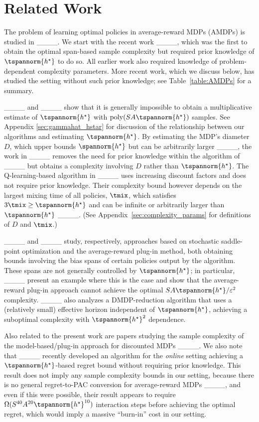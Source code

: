 \section{Related Work}
The problem of learning optimal policies in average-reward MDPs (AMDPs) is studied in ____. We start with the recent work ____, which was the first to obtain the optimal span-based sample complexity but required prior knowledge of $\tspannorm{h^\star}$ to do so. All earlier work also required knowledge of problem-dependent complexity parameters. More recent work, which we discuss below, has studied the setting without such prior knowledge; see Table~\ref{table:AMDPs} for a summary.

____ and ____ show that it is generally impossible to obtain a multiplicative estimate of $\tspannorm{h^\star}$ with $\text{poly}(SA\tspannorm{h^\star})$ samples. See Appendix \ref{sec:gammahat_hstar} for discussion of the relationship between our algorithms and estimating $\tspannorm{h^\star}$. 
By estimating the MDP's diameter $D$, which upper bounds $\spannorm{h^\star} $ but can be arbitrarily larger ____, the work in ____ removes the need for prior knowledge within the algorithm of ____ but obtains a complexity involving $D$ rather than $\tspannorm{h^\star}$. The Q-learning-based algorithm in ____ uses increasing discount factors and does not require prior knowledge. Their complexity bound however depends on the largest mixing time of all policies, $\tmix$, which  satisfies $3\tmix \geq \tspannorm{h^\star}$ and can be infinite or arbitrarily larger than $\tspannorm{h^\star}$ ____.
(See Appendix~\ref{sec:complexity_params} for definitions of $D$ and $\tmix$.) 

____ and ____ study, respectively, approaches based on stochastic saddle-point optimization and the average-reward plug-in method, both obtaining bounds involving the bias spans of certain policies output by the algorithm. These spans are not generally controlled by $\tspannorm{h^\star}$; in particular, ____ present an example where this is the case and show that the average-reward plug-in approach cannot achieve the optimal $SA \tspannorm{h^\star}/\varepsilon^2$ complexity. ____ also analyzes a DMDP-reduction algorithm that uses a (relatively small) effective horizon independent of $\tspannorm{h^\star}$, achieving a suboptimal complexity with $\tspannorm{h^\star}^2$ dependence.

Also related to the present work are papers studying the sample complexity of the model-based/plug-in approach for discounted MDPs  ____.
We also note that ____ recently developed an algorithm for the \emph{online} setting achieving a $\tspannorm{h^\star}$-based regret bound without requiring prior knowledge. This result does not imply any sample complexity bounds in our setting, because there is no general regret-to-PAC conversion for average-reward MDPs ____, and even if this were possible, their result appears to require $\Omega(S^{40}A^{20}\tspannorm{h^\star}^{10})$ interaction steps before achieving the optimal regret, which would imply a massive ``burn-in'' cost in our setting.


